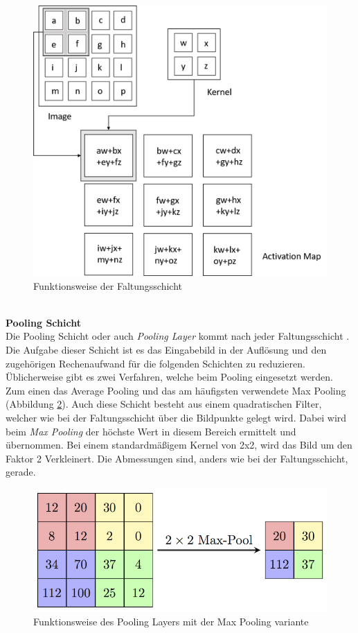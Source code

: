 \begin{figure}
	[h]
	\centering
	\includegraphics[scale=0.4]{Sources/CNN.png}
	\caption{Funktionsweise der Faltungsschicht \cite{convolutional2019layer}}
	\label{img:faltungsschicht}
\end{figure}\\
\textbf{Pooling Schicht}\\
Die Pooling Schicht oder auch \textit{Pooling Layer} kommt nach jeder Faltungsschicht \cite[336f.]{goodfellow2016deep}. Die Aufgabe dieser Schicht ist es das Eingabebild in der Auflösung und den zugehörigen Rechenaufwand für die folgenden Schichten zu reduzieren. Üblicherweise gibt es zwei Verfahren, welche beim Pooling eingesetzt werden. Zum einen das Average Pooling und das am häufigsten verwendete Max Pooling (Abbildung \ref{img:maxpooling}). Auch diese Schicht besteht aus einem quadratischen Filter, welcher wie bei der Faltungsschicht über die Bildpunkte gelegt wird. Dabei wird beim \textit{Max Pooling} der höchste Wert in diesem Bereich ermittelt und übernommen. Bei einem standardmäßigem Kernel von 2x2, wird das Bild um den Faktor 2 Verkleinert. Die Abmessungen sind, anders wie bei der Faltungsschicht, gerade.
\begin{figure}
	[h]
	\centering
	\includegraphics[scale=1.8]{Sources/MaxpoolSample2.png}
	\caption{Funktionsweise des Pooling Layers mit der Max Pooling variante \cite{pooling2018layer}}
	\label{img:maxpooling}
\end{figure}\\
